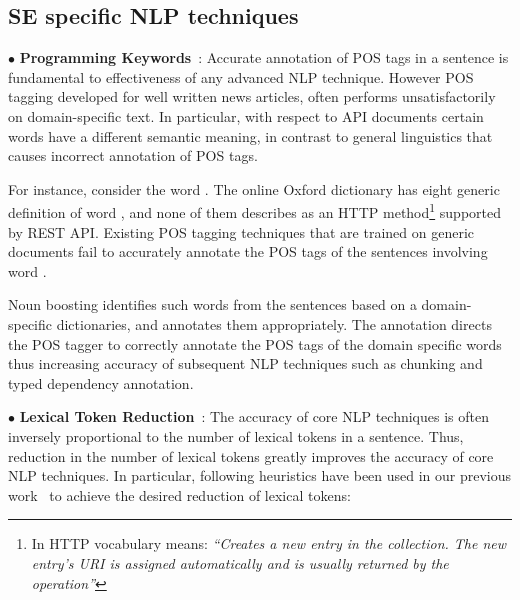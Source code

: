 

\subsection{SE specific NLP techniques}
\label{sub:SENLPback}

{\small $\bullet$} \textbf{Programming Keywords}~\cite{pandita12:inferring}: Accurate annotation of POS tags in a sentence is fundamental to effectiveness of any advanced NLP technique.
However POS tagging developed for well written news articles, often performs unsatisfactorily on domain-specific text.
In particular, with respect to API documents certain words have a different semantic meaning, in contrast to general linguistics that causes incorrect annotation of POS tags.

For instance, consider the word . 
The online Oxford dictionary %
has eight generic definition of word , and none of them describes  as an HTTP method\footnote{In HTTP vocabulary  means: \textit{``Creates a new entry in the collection.
The new entry's URI is assigned automatically and is usually returned by the operation''}}
supported by REST API.
Existing POS tagging techniques that are trained on generic documents fail to accurately annotate the POS tags of the sentences involving word . 

Noun boosting identifies such words from the sentences based on a domain-specific dictionaries, and annotates them appropriately.
The annotation directs the POS tagger to correctly annotate the POS tags of the domain specific words thus increasing accuracy of subsequent NLP techniques such as chunking and typed dependency annotation.

{\small $\bullet$} \textbf{Lexical Token Reduction}~\cite{pandita13:WHYPER}:
The accuracy of core NLP techniques is often inversely proportional to the number of lexical tokens in a sentence.
Thus, reduction in the number of lexical tokens greatly improves the accuracy of core NLP techniques. 
In particular, following heuristics have been used in our previous work~\cite{pandita12:inferring,pandita13:WHYPER} to achieve the desired reduction of lexical tokens:

